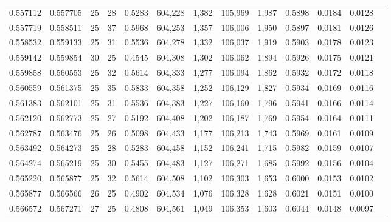 \begin{tabular}{rrrrrrrrrrrrr}
0.557112 & 0.557705 &    25 &  28 &                                     0.5283 & 604,228 &   1,382 & 105,969 &   1,987 & 0.5898 & 0.0184 & 0.0128 \\
0.557719 & 0.558511 &    25 &  37 &                                     0.5968 & 604,253 &   1,357 & 106,006 &   1,950 & 0.5897 & 0.0181 & 0.0126 \\
0.558532 & 0.559133 &    25 &  31 &                                     0.5536 & 604,278 &   1,332 & 106,037 &   1,919 & 0.5903 & 0.0178 & 0.0123 \\
0.559142 & 0.559854 &    30 &  25 &                                     0.4545 & 604,308 &   1,302 & 106,062 &   1,894 & 0.5926 & 0.0175 & 0.0121 \\
0.559858 & 0.560553 &    25 &  32 &                                     0.5614 & 604,333 &   1,277 & 106,094 &   1,862 & 0.5932 & 0.0172 & 0.0118 \\
0.560559 & 0.561375 &    25 &  35 &                                     0.5833 & 604,358 &   1,252 & 106,129 &   1,827 & 0.5934 & 0.0169 & 0.0116 \\
0.561383 & 0.562101 &    25 &  31 &                                     0.5536 & 604,383 &   1,227 & 106,160 &   1,796 & 0.5941 & 0.0166 & 0.0114 \\
0.562120 & 0.562773 &    25 &  27 &                                     0.5192 & 604,408 &   1,202 & 106,187 &   1,769 & 0.5954 & 0.0164 & 0.0111 \\
0.562787 & 0.563476 &    25 &  26 &                                     0.5098 & 604,433 &   1,177 & 106,213 &   1,743 & 0.5969 & 0.0161 & 0.0109 \\
0.563492 & 0.564273 &    25 &  28 &                                     0.5283 & 604,458 &   1,152 & 106,241 &   1,715 & 0.5982 & 0.0159 & 0.0107 \\
0.564274 & 0.565219 &    25 &  30 &                                     0.5455 & 604,483 &   1,127 & 106,271 &   1,685 & 0.5992 & 0.0156 & 0.0104 \\
0.565220 & 0.565877 &    25 &  32 &                                     0.5614 & 604,508 &   1,102 & 106,303 &   1,653 & 0.6000 & 0.0153 & 0.0102 \\
0.565877 & 0.566566 &    26 &  25 &                                     0.4902 & 604,534 &   1,076 & 106,328 &   1,628 & 0.6021 & 0.0151 & 0.0100 \\
0.566572 & 0.567271 &    27 &  25 &                                     0.4808 & 604,561 &   1,049 & 106,353 &   1,603 & 0.6044 & 0.0148 & 0.0097 \\

\end{tabular}
